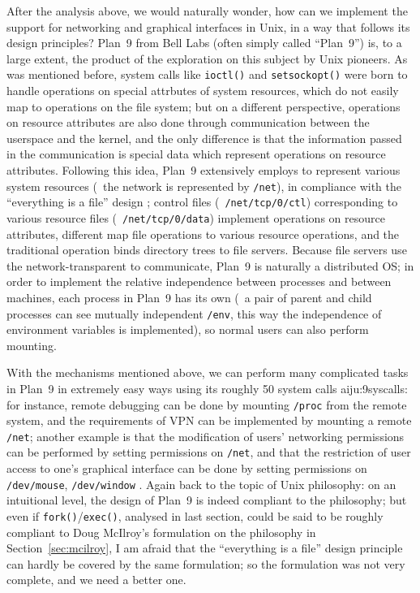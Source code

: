 After the analysis above, we would naturally wonder, how can we implement the
support for networking and graphical interfaces in Unix, in a way that follows
its design principles?  Plan~9 from Bell Labs (often simply called ``Plan~9'')
is, to a large extent, the product of the exploration on this subject by Unix
pioneers.  As was mentioned before, system calls like
\verb|ioctl()| and \verb|setsockopt()| were born to handle operations on
special attrbutes of system resources, which do not easily map to operations
on the file system; but on a different perspective, operations on resource
attributes are also done through communication between the userspace and
the kernel, and the only difference is that the information passed in the
communication is special data which represent operations on resource attributes.
Following this idea, Plan~9 extensively employs 
to represent various system resources (\eg~the network is represented by
\verb|/net|), in compliance with the ``everything is a file'' design%
; control files (\eg~\verb|/net/tcp/0/ctl|) corresponding
to various resource files (\eg~\verb|/net/tcp/0/data|) implement operations
on resource attributes, different  map file operations
to various resource operations, and the traditional 
operation binds directory trees to file servers.  Because file servers use
the network-transparent  to communicate, Plan~9 is
naturally a distributed OS; in order to implement the relative independence
between processes and between machines, each process in Plan~9 has its own
 (\eg~a pair of parent and child processes can see mutually
independent \verb|/env|, this way the independence of environment variables
is implemented), so normal users can also perform mounting.

With the mechanisms mentioned above, we can perform many complicated tasks in
Plan~9 in extremely easy ways using its roughly 50 system calls\cupercite%
{aiju:9syscalls}: for instance, remote debugging can be done by mounting
\verb|/proc| from the remote system, and the requirements of VPN can be
implemented by mounting a remote \verb|/net|; another example is that the
modification of users' networking permissions can be performed by setting
permissions on \verb|/net|, and that the restriction of user access to one's
graphical interface can be done by setting permissions on \verb|/dev/mouse|,
\verb|/dev/window| \etc.  Again back to the topic of Unix philosophy: on an
intuitional level, the design of Plan~9 is indeed compliant to the philosophy;
but even if \verb|fork()|/\verb|exec()|, analysed in last section, could be
said to be roughly compliant to Doug McIlroy's formulation on the philosophy
in Section~\ref{sec:mcilroy}, I am afraid that the ``everything is a file''
design principle can hardly be covered by the same formulation; so
the formulation was not very complete, and we need a better one.

